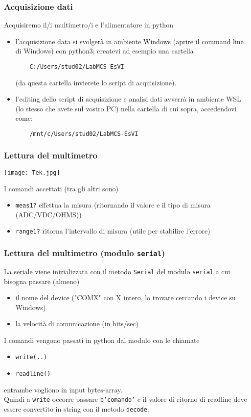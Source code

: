 \begin{frame}[fragile]
  \frametitle{Acquisizione dati}
  Acquisiremo il/i multimetro/i e l'alimentatore in python
  \begin{itemize}
  \item l'acquisizione data si svolger\`a in ambiente Windows
    (aprire il command line di Windows) con python3; createvi ad esempio una cartella
    \begin{verbatim}
    C:/Users/stud02/LabMCS-EsVI 
\end{verbatim}
    \vskip -0.1cm
    (da questa cartella invierete lo script di acquisizione).
  \item l'editing dello script di acquisizione e analisi dati avverr\`a in ambiente WSL (lo stesso che avete sul vostro PC)  nella cartella di cui sopra, accedendovi come:
    \begin{verbatim}
    /mnt/c/Users/stud02/LabMCS-EsVI
    \end{verbatim}
  \end{itemize}
\end{frame}

\begin{frame}[fragile]
  \frametitle{Lettura del multimetro}
  \begin{center}
     \texttt{[image: Tek.jpg]}
  \end{center}
  \vskip -0.2cm
  I comandi accettati (tra gli altri sono)
  \begin{itemize}
  \item {\tt meas1?} effettua la misura (ritornando il valore e il tipo di misura (ADC/VDC/OHMS))
  \item {\tt range1?} ritorna l'intervallo di misura (utile per stabilire l'errore)
  \end{itemize}
\end{frame}  

\begin{frame}[fragile]
  \frametitle{Lettura del multimetro (modulo {\tt serial})}
  La seriale viene inizializzata con il metodo {\tt Serial} del modulo {\tt serial} a cui bisogna passare (almeno)
  \begin{itemize}
  \item il nome del device ("COMX" con X intero, lo trovare cercando i device su Windows)
  \item la velocit\`a di comunicazione (in bits/sec)
  \end{itemize}
  I comandi vengono passati in python dal modulo con le chiamate
  \begin{itemize}
    \item {\tt write(..)}
    \item {\tt readline()}
  \end{itemize}
  entrambe vogliono in input bytes-array. \\ Quindi a {\tt write} occorre passare {\tt b'comando'}
  e il valore di ritorno di readline deve essere convertito in string con il metodo {\tt decode}.
  
\end{frame}


